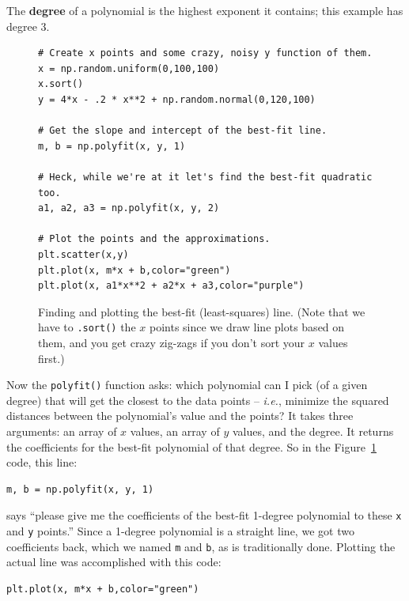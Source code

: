 
The \textbf{degree} of a polynomial is the highest exponent it contains; this
example has degree 3.

\bigskip
\begin{figure}[hb]
\begin{Verbatim}[fontsize=\footnotesize,samepage=true,frame=single,framesep=3mm]
# Create x points and some crazy, noisy y function of them.
x = np.random.uniform(0,100,100)
x.sort()
y = 4*x - .2 * x**2 + np.random.normal(0,120,100)

# Get the slope and intercept of the best-fit line.
m, b = np.polyfit(x, y, 1)

# Heck, while we're at it let's find the best-fit quadratic too.
a1, a2, a3 = np.polyfit(x, y, 2)

# Plot the points and the approximations.
plt.scatter(x,y)
plt.plot(x, m*x + b,color="green")
plt.plot(x, a1*x**2 + a2*x + a3,color="purple")
\end{Verbatim}
\caption{Finding and plotting the best-fit (least-squares) line. (Note that we
have to \texttt{.sort()} the $x$ points since we draw line plots based on
them, and you get crazy zig-zags if you don't sort your $x$ values first.)}
\label{fig:bestFitCode}
\end{figure}
\bigskip
 

Now the \texttt{polyfit()} function asks: which polynomial can I pick (of a
given degree) that will get the closest to the data points -- \textit{i.e.},
minimize the squared distances between the polynomial's value and the points?
It takes three arguments: an array of $x$ values, an array of $y$ values, and
the degree. It returns the coefficients for the best-fit polynomial of that
degree. So in the Figure~\ref{fig:bestFitCode} code, this line:

\begin{Verbatim}[fontsize=\small,samepage=true,frame=single,framesep=3mm]
m, b = np.polyfit(x, y, 1)
\end{Verbatim}

says ``please give me the coefficients of the best-fit 1-degree polynomial to
these \texttt{x} and \texttt{y} points.'' Since a 1-degree polynomial is a
straight line, we got two coefficients back, which we named \texttt{m} and
\texttt{b}, as is traditionally done. Plotting the actual line was accomplished
with this code:

\begin{Verbatim}[fontsize=\small,samepage=true,frame=single,framesep=3mm]
plt.plot(x, m*x + b,color="green")
\end{Verbatim}

